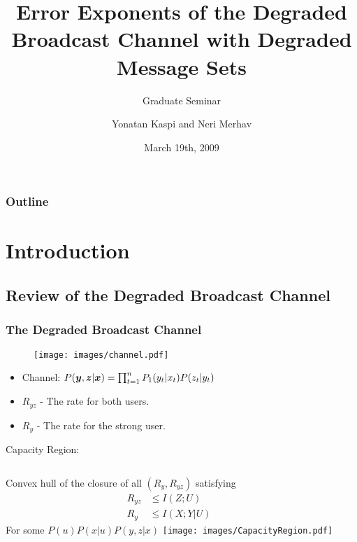 \documentclass[mathserif]{beamer}
\title[]
{Error Exponents of the Degraded Broadcast Channel with Degraded Message Sets}
\subtitle{Graduate Seminar}
\author[Y. Kaspi and N. Merhav]{Yonatan Kaspi and Neri Merhav}
\institute[Technion] %
   {Department of Electrical Engineering \\ Technion - Israel Institute of Technology\\ Haifa, Israel\bigskip\\}
\date[March 19th, 2009]{March 19th, 2009}
\newcommand {\bx} {\mbox{\boldmath $x$}}
\newcommand {\by} {\mbox{\boldmath $y$}}
\newcommand {\bz} {\mbox{\boldmath $z$}}
\begin{document}
\begin{frame}
  \titlepage
\end{frame}



\begin{frame}
  \frametitle{Outline}
  \tableofcontents[pausesections]
\end{frame}
%

\section{Introduction}
%
\subsection{Review of the Degraded Broadcast Channel}
\begin{frame}
\frametitle{The Degraded Broadcast Channel}
\begin{figure}
    \centering
    \texttt{[image: images/channel.pdf]}
\end{figure}

\begin{itemize}
\item Channel: $P(\by,\bz|\bx)=\prod_{t=1}^n
P_1(y_t|x_t)P(z_t|y_t)$
\pause
\item $R_{yz}$ - The rate for both users.
\pause
\item $R_y$ - The rate for the strong user.
\pause
\end{itemize}
\begin{exampleblock}{Capacity Region:}
\begin{columns}
Convex hull of the closure of all $(R_y, R_{yz})$ satisfying
\begin{align*}
    R_{yz} &\leq I(Z;U)\\
    R_y &\leq I(X;Y|U)
\end{align*}
For some $P(u)P(x|u)P(y,z|x)$
\texttt{[image: images/CapacityRegion.pdf]}
\end{columns}
\end{exampleblock}
\end{frame}
\end{document}
